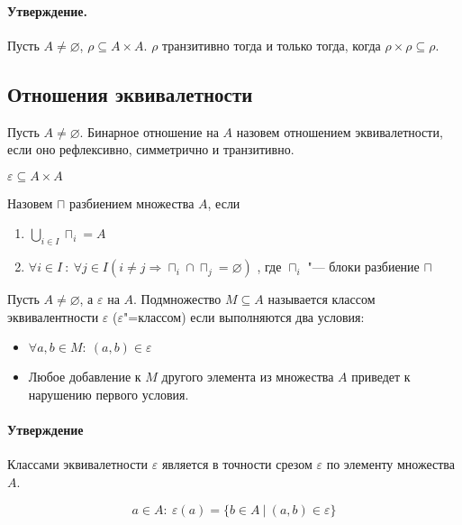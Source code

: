 \paragraph{Утверждение.} Пусть $A \neq \varnothing$, $\rho \subseteq A \times A$. $\rho$ транзитивно
тогда и только тогда, когда $\rho \times \rho \subseteq \rho$.

\subsection{Отношения эквивалетности}

Пусть $A \neq \varnothing$. Бинарное отношение на $A$ назовем отношением эквивалетности, если
оно рефлексивно, симметрично и транзитивно.

$\varepsilon \subseteq A \times A$

Назовем $\sqcap$ разбиением множества $A$, если

\begin{enumerate}
    \item $\bigcup\limits_{i \in I} \sqcap_i = A$ 
    \item $\forall i \in I ~:~ \forall j \in I (i \neq j \Rightarrow \sqcap_i \cap \sqcap_j = \varnothing)$
    , где $\sqcap_i$ "--- блоки разбиение $\sqcap$
\end{enumerate}

\begin{definition}
    Пусть $A \neq \varnothing$, а $\varepsilon$ на $A$.
    Подмножество $M \subseteq A$ называется классом
    эквивалентности $\varepsilon$ ($\varepsilon$"=классом) если
    выполняются два условия:
    \begin{itemize}
        \item $\forall a, b \in M:~ (a, b) \in \varepsilon$
        \item Любое добавление к $M$ другого элемента из множества $A$
        приведет к нарушению первого условия.
    \end{itemize}
\end{definition}

\paragraph{Утверждение} Классами эквивалетности $\varepsilon$ является
в точности срезом $\varepsilon$ по элементу множества $A$.

\begin{equation*}
    a \in A: ~  \varepsilon(a) = \{b \in A ~|~ (a, b) \in \varepsilon\}
\end{equation*}

